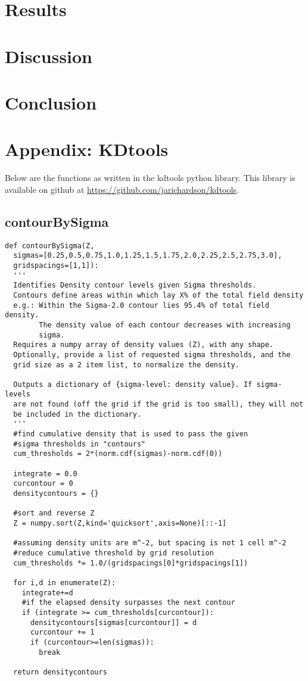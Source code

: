 \documentclass[12pt,letter]{article}
\begin{document}
\section{Results}

\section{Discussion}

\section{Conclusion}

\section{Appendix: KDtools}
\label{sec_kdtoolscode}
Below are the functions as written in the kdtools python library. This library is available on github at \url{https://github.com/jarichardson/kdtools}.

\subsection{contourBySigma}
\begin{verbatim}
def contourBySigma(Z, 
  sigmas=[0.25,0.5,0.75,1.0,1.25,1.5,1.75,2.0,2.25,2.5,2.75,3.0],
  gridspacings=[1,1]):
  '''
  Identifies Density contour levels given Sigma thresholds.
  Contours define areas within which lay X% of the total field density
  e.g.: Within the Sigma-2.0 contour lies 95.4% of total field density.
        The density value of each contour decreases with increasing
        sigma.
  Requires a numpy array of density values (Z), with any shape.
  Optionally, provide a list of requested sigma thresholds, and the
  grid size as a 2 item list, to normalize the density.
  
  Outputs a dictionary of {sigma-level: density value}. If sigma-levels
  are not found (off the grid if the grid is too small), they will not
  be included in the dictionary.
  '''
  #find cumulative density that is used to pass the given
  #sigma thresholds in "contours"
  cum_thresholds = 2*(norm.cdf(sigmas)-norm.cdf(0))
  
  integrate = 0.0
  curcontour = 0
  densitycontours = {}
  
  #sort and reverse Z
  Z = numpy.sort(Z,kind='quicksort',axis=None)[::-1]
  
  #assuming density units are m^-2, but spacing is not 1 cell m^-2
  #reduce cumulative threshold by grid resolution
  cum_thresholds *= 1.0/(gridspacings[0]*gridspacings[1])
  
  for i,d in enumerate(Z):
    integrate+=d
    #if the elapsed density surpasses the next contour
    if (integrate >= cum_thresholds[curcontour]):
      densitycontours[sigmas[curcontour]] = d
      curcontour += 1
      if (curcontour>=len(sigmas)):
        break
  
  return densitycontours
\end{verbatim}
\end{document}
